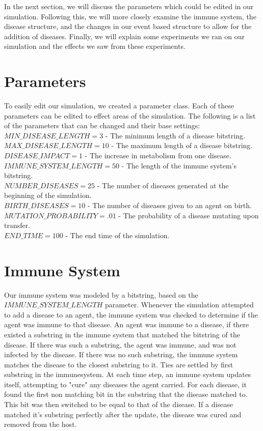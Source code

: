 \documentclass[12pt,a4paper]{article} %
\begin{document}
    In the next section, we will discuss the parameters which could be edited in our simulation. Following this, we will more closely examine the immune system, the disease structure, and the changes in our event based structure to allow for the addition of diseases. Finally, we will explain some experiments we ran on our simulation and the effects we saw from these experiments.
    
    \section{Parameters}
    To easily edit our simulation, we created a parameter class. Each of these parameters can be edited to effect areas of the simulation. The following is a list of the parameters that can be changed and their base settings:\\
    $MIN\_DISEASE\_LENGTH = 3$ - The minimum length of a disease bitstring.\\
    $MAX\_DISEASE\_LENGTH = 10$ - The maximum length of a disease bitstring.\\
    $DISEASE\_IMPACT = 1$ - The increase in metabolism from one disease.\\
    $IMMUNE\_SYSTEM\_LENGTH = 50$ - The length of the immune system's bitstring.\\
    $NUMBER\_DISEASES = 25$ - The number of diseases generated at the beginning of the simulation.\\
    $BIRTH\_DISEASES = 10$ - The number of diseases given to an agent on birth.\\
    $MUTATION\_PROBABILITY = .01$ - The probability of a disease mutating upon transfer.\\
    $END\_TIME = 100$ - The end time of the simulation.
    
    \section{Immune System}
    Our immune system was modeled by a bitstring, based on the $IMMUNE\_SYSTEM\_LENGTH$ parameter. Whenever the simulation attempted to add a disease to an agent, the immune system was checked to determine if the agent was immune to that disease. An agent was immune to a disease, if there existed a substring in the immune system that matched the bitstring of the disease. If there was such a substring, the agent was immune, and was not infected by the disease. If there was no such substring, the immune system matches the disease to the closest substring to it. Ties are settled by first substring in the immunesystem. At each time step, an immune system updates itself, attempting to "cure" any diseases the agent carried. For each disease, it found the first non matching bit in the substring that the disease matched to. This bit was then switched to be equal to that of the disease. If a disease matched it's substring perfectly after the update, the disease was cured and removed from the host.
    
\end{document}
